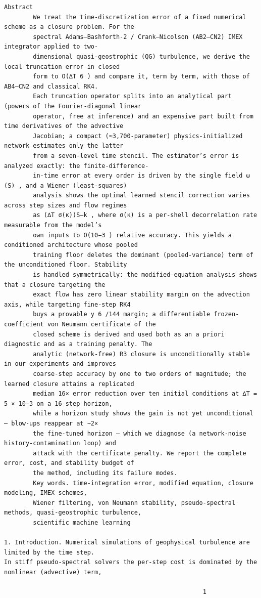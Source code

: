 \documentclass[letterpaper]{article}
\begin{document}
\begin{Verbatim}[fontsize=\fontsize{6.35}{7.15}\selectfont,breaklines=false]
                                                  Abstract
        We treat the time-discretization error of a fixed numerical scheme as a closure problem. For the
        spectral Adams–Bashforth-2 / Crank–Nicolson (AB2–CN2) IMEX integrator applied to two-
        dimensional quasi-geostrophic (QG) turbulence, we derive the local truncation error in closed
        form to O(∆T 6 ) and compare it, term by term, with those of AB4–CN2 and classical RK4.
        Each truncation operator splits into an analytical part (powers of the Fourier-diagonal linear
        operator, free at inference) and an expensive part built from time derivatives of the advective
        Jacobian; a compact (≈3,700-parameter) physics-initialized network estimates only the latter
        from a seven-level time stencil. The estimator’s error is analyzed exactly: the finite-difference-
        in-time error at every order is driven by the single field ω (S) , and a Wiener (least-squares)
        analysis shows the optimal learned stencil correction varies across step sizes and flow regimes
        as (∆T σ(κ))S−k , where σ(κ) is a per-shell decorrelation rate measurable from the model’s
        own inputs to O(10−3 ) relative accuracy. This yields a conditioned architecture whose pooled
        training floor deletes the dominant (pooled-variance) term of the unconditioned floor. Stability
        is handled symmetrically: the modified-equation analysis shows that a closure targeting the
        exact flow has zero linear stability margin on the advection axis, while targeting fine-step RK4
        buys a provable y 6 /144 margin; a differentiable frozen-coefficient von Neumann certificate of the
        closed scheme is derived and used both as an a priori diagnostic and as a training penalty. The
        analytic (network-free) R3 closure is unconditionally stable in our experiments and improves
        coarse-step accuracy by one to two orders of magnitude; the learned closure attains a replicated
        median 16× error reduction over ten initial conditions at ∆T = 5 × 10−3 on a 16-step horizon,
        while a horizon study shows the gain is not yet unconditional — blow-ups reappear at ∼2×
        the fine-tuned horizon — which we diagnose (a network-noise history-contamination loop) and
        attack with the certificate penalty. We report the complete error, cost, and stability budget of
        the method, including its failure modes.
        Key words. time-integration error, modified equation, closure modeling, IMEX schemes,
        Wiener filtering, von Neumann stability, pseudo-spectral methods, quasi-geostrophic turbulence,
        scientific machine learning

1. Introduction. Numerical simulations of geophysical turbulence are limited by the time step.
In stiff pseudo-spectral solvers the per-step cost is dominated by the nonlinear (advective) term,

                                                       1
\end{Verbatim}
\end{document}
